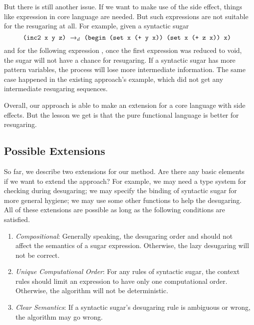 But there is still another issue. If we want to make use of the side effect, things like  expression in core language are needed. But such expressions are not suitable for the resugaring at all. For example, given a syntactic sugar 
\[\texttt{(inc2 x y z)} ~\rightarrow_d~ \texttt{(begin (set x (+ y x)) (set x (+ z x)) x)}\]
and for the following expression , once the first  expression was reduced to void, the  sugar will not have a chance for resugaring. If a syntactic sugar has more pattern variables, the process will lose more intermediate information. The same case happened in the existing approach\cite{resugaring}'s  example, which did not get any intermediate resugaring sequences.

Overall, our approach is able to make an extension for a core language with side effects. But the lesson we get is that the pure functional language is better for resugaring.


\subsection{Possible Extensions}

So far, we describe two extensions for our method. Are there any basic elements if we want to extend the approach? For example, we may need a type system for checking during desugaring; we may specify the binding of syntactic sugar for more general hygiene; we may use some other functions to help the desugaring. All of these extensions are possible as long as the following conditions are satisfied.
\begin{enumerate}
	\item \emph{Compositional}: Generally speaking, the desugaring order and should not affect the semantics of a sugar expression. Otherwise, the lazy desugaring will not be correct.
	\item \emph{Unique Computational Order}: For any rules of syntactic sugar, the context rules should limit an expression to have only one computational order. Otherwise, the algorithm  will not be deterministic.
	\item \emph{Clear Semantics}: If a syntactic sugar's desugaring rule is ambiguous or wrong, the algorithm  may go wrong.
\end{enumerate}






